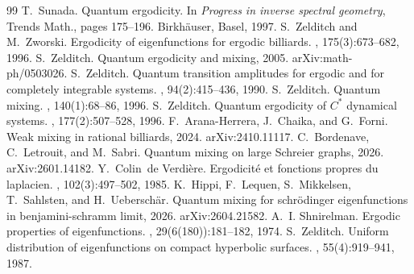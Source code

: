\documentclass[10pt,a4paper]{amsart}
\newcommand{\1}{\mathrm{\mathbf{1}}}
\numberwithin{equation}{section}
\begin{document}
\begin{thebibliography}{99}
 T.~Sunada. \newblock Quantum ergodicity. \newblock In {\em Progress in inverse spectral geometry}, Trends Math., pages 175--196. Birkh\"auser, Basel, 1997.
 S.~Zelditch and M.~Zworski. \newblock Ergodicity of eigenfunctions for ergodic billiards. , 175(3):673--682, 1996.
 S.~Zelditch. \newblock Quantum ergodicity and mixing, 2005. \newblock arXiv:math-ph/0503026.
 S.~Zelditch. \newblock Quantum transition amplitudes for ergodic and for completely integrable systems. , 94(2):415--436, 1990.
 S.~Zelditch. \newblock Quantum mixing. , 140(1):68--86, 1996.
 S.~Zelditch. \newblock Quantum ergodicity of {$C^*$} dynamical systems. , 177(2):507--528, 1996.
 F.~Arana-Herrera, J.~Chaika, and G.~Forni. \newblock Weak mixing in rational billiards, 2024. \newblock arXiv:2410.11117.
 C.~Bordenave, C.~Letrouit, and M.~Sabri. \newblock Quantum mixing on large {S}chreier graphs, 2026. \newblock arXiv:2601.14182.
 Y.~Colin~de Verdi\`ere. \newblock Ergodicit\'e{} et fonctions propres du laplacien. , 102(3):497--502, 1985.
 K.~Hippi, F.~Lequen, S.~Mikkelsen, T.~Sahlsten, and H.~Uebersch\"ar. \newblock Quantum mixing for schr\"odinger eigenfunctions in benjamini-schramm limit, 2026. \newblock arXiv:2604.21582.
 A.~I. Shnirelman. \newblock Ergodic properties of eigenfunctions. , 29(6(180)):181--182, 1974.
 S.~Zelditch. \newblock Uniform distribution of eigenfunctions on compact hyperbolic surfaces. , 55(4):919--941, 1987.
\end{thebibliography}
\end{document}
